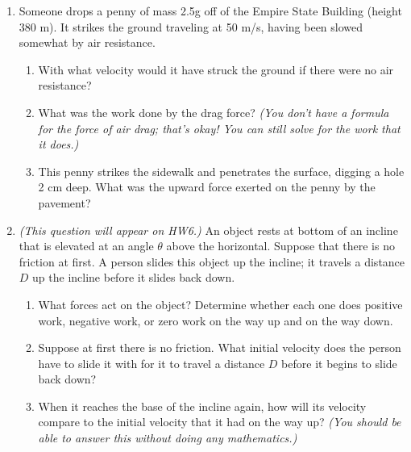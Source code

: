 \documentclass[12pt]{article}
\begin{document}
\newpage

\begin{enumerate}

\item{Someone drops a penny of mass 2.5g off of the Empire State Building (height 380 m). It strikes the ground traveling at 50 m/s, having been slowed somewhat by air resistance.}
\begin{enumerate}
	\item{With what velocity would it have struck the ground if there were no air resistance?}
	\vspace{2.5in}
	\item{What was the work done by the drag force? {\it (You don't have a formula for the force of air drag; that's okay! You can still solve for the work that it does.)}}
	\vspace{2.5in}
	\item{This penny strikes the sidewalk and penetrates the surface, digging a hole 2 cm deep. What was the upward force exerted on the penny by the pavement?}
	\vspace{2in}
\end{enumerate}

\newpage


\item{{\it (This question will appear on HW6.)} An object rests at bottom of an incline that is elevated at an angle $\theta$ above the horizontal. Suppose that there is no friction at first. A person slides this object up the incline; it travels a distance $D$ up the incline before it slides back down.}
	
	\begin{enumerate}
		
		\item What forces act on the object? Determine whether each one does positive work, negative work, or zero work on the way up and on the way down.

\vspace{2in}

\item	Suppose at first there is no friction. What initial velocity does the person have to slide it with for it to travel a distance $D$ before it begins to slide back down? 
	
	\vspace{2.5in}
	
\item	When it reaches the base of the incline again, how will its velocity compare to the initial velocity that it had on the way up? {\it (You should be able to answer this without doing any mathematics.)}
	

\end{enumerate}
\end{enumerate}
\end{document}

